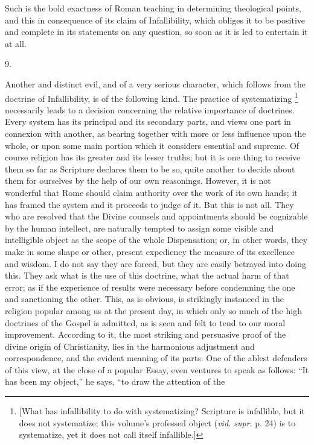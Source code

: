 Such is the bold exactness of Roman teaching in determining
theological points, and this in consequence of its claim of
Infallibility, which obliges it to be positive and complete in its
statements on any question, so soon as it is led to entertain it at
all.

9.

Another and distinct evil, and of a very serious character, which
follows from the doctrine of Infallibility, is of the following kind.
The practice of systematizing \footnote{[What has infallibility to do with
systematizing? Scripture is infallible, but it does not systematize;
this volume's professed object (\emph{vid. supr}. p. 24) is to
systematize, yet it does not call itself infallible.]} necessarily leads to a decision concerning the relative
importance of doctrines. Every system has its principal and its
secondary parts, and views one part in connexion with another, as
bearing together with more or less influence upon the whole, or upon
some main portion which it considers essential and supreme. Of course
religion has its greater and its lesser truths; but it is one thing to
receive them so far as Scripture declares them to be so, quite another
to decide about them for ourselves by the help of our own reasonings.
However, it is not wonderful that Rome should claim authority over the
work of its own hands; it has framed the system and it proceeds to
judge of it. But this is not all. They who are resolved that the
Divine counsels and appointments should be cognizable by the human
intellect, are naturally tempted to assign some visible and
intelligible object as the scope of the whole Dispensation; or, in
other words, they make in some shape or other, present expediency the
measure of its excellence and wisdom. I do not say they are forced,
but they are easily betrayed into doing this. They ask what is the use
of this doctrine, what the actual harm of that error; as if the
experience of results were necessary before condemning the one and
sanctioning the other. This, as is obvious, is strikingly instanced in
the religion popular among us at the present day, in which only so
much of the high doctrines of the Gospel is admitted, as is seen and
felt to tend to our moral improvement. According to it, the most
striking and persuasive proof of the divine origin of Christianity,
lies in the harmonious adjustment and correspondence, and the evident
meaning of its parts. One of the ablest defenders of this view, at the
close of a popular Essay, even ventures to speak as follows: ``It
has been my object,'' he says, ``to draw the attention of the
